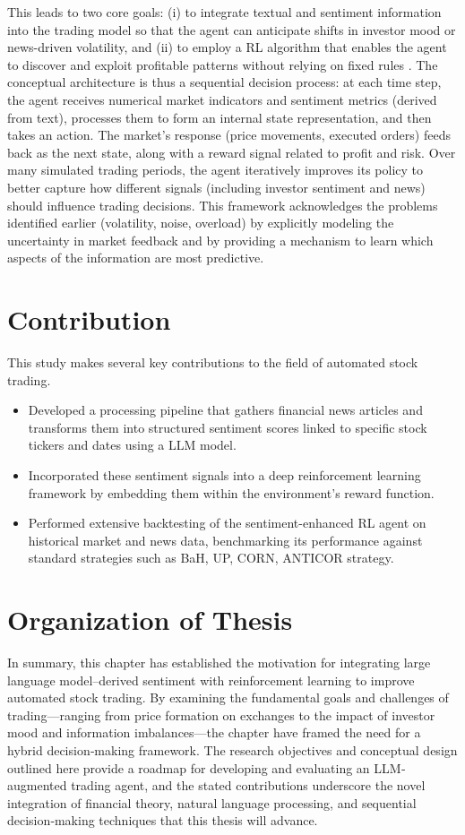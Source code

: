 This leads to two core goals: (i) to integrate textual and sentiment information into the trading model so that the agent can anticipate shifts in investor mood or news-driven volatility, and (ii) to employ a \gls{RL} algorithm that enables the agent to discover and exploit profitable patterns without relying on fixed rules \cite{Nevmyvaka2006}. The conceptual architecture is thus a sequential decision process: at each time step, the agent receives numerical market indicators and sentiment metrics (derived from text), processes them to form an internal state representation, and then takes an action. The market’s response (price movements, executed orders) feeds back as the next state, along with a reward signal related to profit and risk. Over many simulated trading periods, the agent iteratively improves its policy to better capture how different signals (including investor sentiment and news) should influence trading decisions. This framework acknowledges the problems identified earlier (volatility, noise, overload) by explicitly modeling the uncertainty in market feedback and by providing a mechanism to learn which aspects of the information are most predictive.

\section{Contribution}
\label{sec:contribution}
This study makes several key contributions to the field of automated stock trading.

\begin{itemize}
  \item Developed a processing pipeline that gathers financial news articles and transforms them into structured sentiment scores linked to specific stock tickers and dates using a \gls{LLM} model.
  \item Incorporated these sentiment signals into a deep reinforcement learning framework by embedding them within the environment’s reward function.
  \item Performed extensive backtesting of the sentiment-enhanced RL agent on historical market and news data, benchmarking its performance against standard strategies such as \gls{BaH}, \gls{UP}, \gls{CORN}, \gls{ANTICOR} strategy.
\end{itemize}

\section{Organization of Thesis}

In summary, this chapter has established the motivation for integrating large language model–derived sentiment with reinforcement learning to improve automated stock trading. By examining the fundamental goals and challenges of trading—ranging from price formation on exchanges to the impact of investor mood and information imbalances—the chapter have framed the need for a hybrid decision‐making framework. The research objectives and conceptual design outlined here provide a roadmap for developing and evaluating an LLM‐augmented trading agent, and the stated contributions underscore the novel integration of financial theory, natural language processing, and sequential decision‐making techniques that this thesis will advance.
